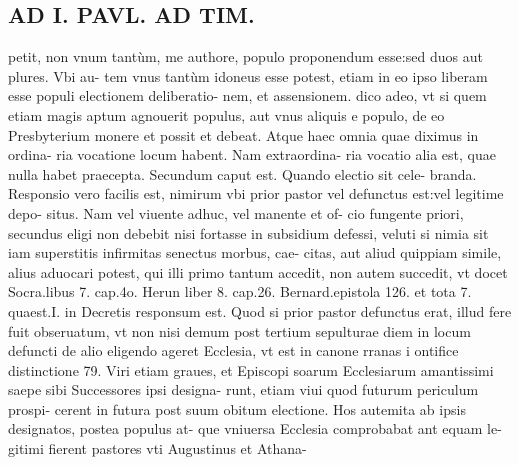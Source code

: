 \documentclass{article}
\begin{document}
\begin{pages}
\section*{AD I. PAVL. AD TIM. }\pstart petit, non vnum tantùm, me authore, populo proponendum esse:sed duos aut plures. Vbi au- tem vnus tantùm idoneus esse potest, etiam in eo ipso liberam esse populi electionem deliberatio- nem, et assensionem. dico adeo, vt si quem etiam magis aptum agnouerit populus, aut vnus aliquis e populo, de eo Presbyterium monere et possit et debeat. Atque  haec omnia quae diximus in ordina- ria vocatione locum habent. Nam extraordina- ria vocatio alia est, quae nulla habet praecepta.  \pend\pstart Secundum caput est. Quando electio sit cele- branda. Responsio vero facilis est, nimirum vbi prior pastor vel defunctus est:vel legitime depo- situs. Nam vel viuente adhuc, vel manente et of- cio fungente priori, secundus eligi non debebit nisi fortasse in subsidium defessi, veluti si nimia sit iam superstitis infirmitas senectus morbus, cae- citas, aut aliud quippiam simile, alius aduocari potest, qui illi primo tantum accedit, non autem succedit, vt docet Socra.libus 7. cap.4o. Herun liber  8. cap.26. Bernard.epistola 126. et tota 7. quaest.I. in Decretis responsum est. Quod si prior pastor defunctus erat, illud fere fuit obseruatum, vt non nisi demum post tertium sepulturae diem in locum defuncti de alio eligendo ageret Ecclesia, vt est in canone rranas i ontifice distinctione 79. Viri etiam graues, et Episcopi soarum Ecclesiarum amantissimi saepe sibi Successores ipsi designa- runt, etiam viui quod futurum periculum prospi- cerent in futura post suum obitum electione. Hos autemita ab ipsis designatos, postea populus at- que vniuersa Ecclesia comprobabat ant equam le- gitimi fierent pastores vti Augustinus et Athana-  \pend

\end{pages}
\end{document}
